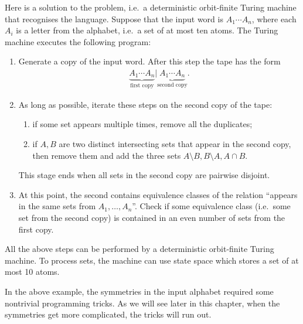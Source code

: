 \begin{myexample}
	Here is a solution to the problem, i.e.~a deterministic orbit-finite Turing machine that recognises the language. Suppose that the input word is $A_1 \cdots A_n$, where each $A_i$ is a letter from the alphabet, i.e.~a set of at most ten atoms.
The Turing machine executes the following program:
\begin{enumerate}
	\item Generate a copy of the input word. After this step the tape has the form
	\begin{align*}
	\underbrace{A_1 \cdots A_n}_{\text{first copy}} | \underbrace{A_1 \cdots A_n}_{\text{second copy}}.
	\end{align*}
	\item As long as possible, iterate these steps on the second copy of the tape: 
	\begin{enumerate}
		\item if some set appears multiple times, remove all  the duplicates;
		\item if $A,B$ are two distinct intersecting sets that appear in the second copy, then remove them and add the three  sets $A \setminus B, B \setminus A, A \cap B$. 
	\end{enumerate}
	This stage ends when all sets in the second copy are pairwise disjoint.
	\item At this point, the second contains equivalence classes of the relation ``appears in the same sets from $A_1,\ldots,A_n$''. Check if some equivalence class (i.e.~some set from the second copy) is contained in an even number of sets from the first copy.
\end{enumerate}
	
All the above steps can be performed by a deterministic orbit-finite Turing machine. To process sets, the machine can use state space which stores a set of at most 10 atoms.
	\end{myexample}

In the above example, the symmetries in the input alphabet required some nontrivial programming tricks. As we will see later in this chapter, when the symmetries get more complicated, the tricks will run out. 

